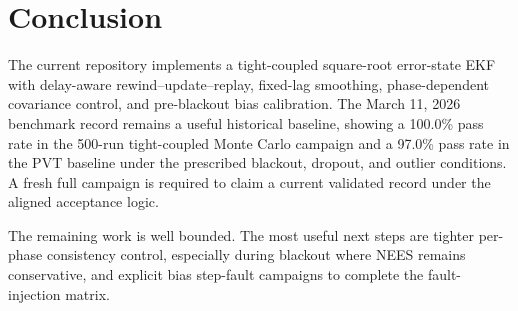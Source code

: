 \documentclass[10pt]{article}
\begin{document}
\section{Conclusion}
The current repository implements a tight-coupled square-root error-state EKF with delay-aware rewind--update--replay, fixed-lag smoothing, phase-dependent covariance control, and pre-blackout bias calibration. The March 11, 2026 benchmark record remains a useful historical baseline, showing a 100.0\% pass rate in the 500-run tight-coupled Monte Carlo campaign and a 97.0\% pass rate in the PVT baseline under the prescribed blackout, dropout, and outlier conditions. A fresh full campaign is required to claim a current validated record under the aligned acceptance logic.

The remaining work is well bounded. The most useful next steps are tighter per-phase consistency control, especially during blackout where NEES remains conservative, and explicit bias step-fault campaigns to complete the fault-injection matrix.
\end{document}
